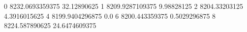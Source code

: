 0 8232.0693359375 32.12890625
1 8209.9287109375 9.98828125
2 8204.33203125 4.3916015625
4 8199.9404296875 0.0
6 8200.443359375 0.5029296875
8 8224.587890625 24.6474609375
